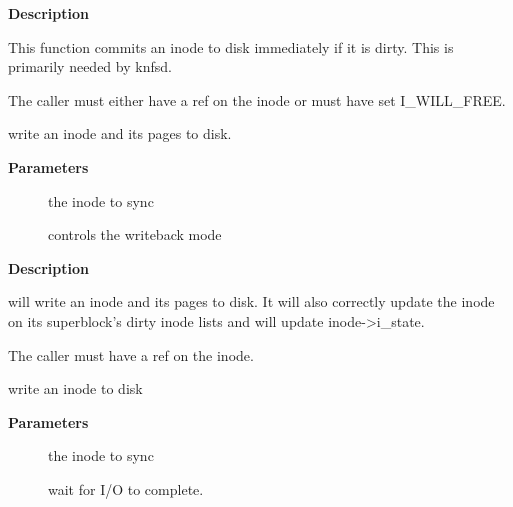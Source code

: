 \documentclass[a4paper,8pt,english]{sphinxmanual}
\begin{document}
\textbf{Description}

This function commits an inode to disk immediately if it is dirty. This is
primarily needed by knfsd.

The caller must either have a ref on the inode or must have set I\_WILL\_FREE.

\begin{fulllineitems}
\label{filesystems/index:c.sync_inode}
write an inode and its pages to disk.

\end{fulllineitems}


\textbf{Parameters}
\begin{description}
\item[{}] \leavevmode
the inode to sync

\item[{}] \leavevmode
controls the writeback mode

\end{description}

\textbf{Description}

{\hyperref[filesystems/index:c.sync_inode]{\emph{}}} will write an inode and its pages to disk.  It will also
correctly update the inode on its superblock's dirty inode lists and will
update inode-\textgreater{}i\_state.

The caller must have a ref on the inode.

\begin{fulllineitems}
\label{filesystems/index:c.sync_inode_metadata}
write an inode to disk

\end{fulllineitems}


\textbf{Parameters}
\begin{description}
\item[{}] \leavevmode
the inode to sync

\item[{}] \leavevmode
wait for I/O to complete.

\end{description}
\end{document}
